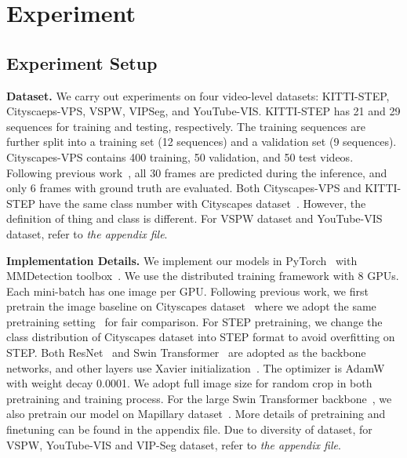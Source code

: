 \section{Experiment}
\label{sec:experiment}



\subsection{Experiment Setup}

\noindent
\textbf{Dataset.} We carry out experiments on four video-level datasets: KITTI-STEP, Cityscaeps-VPS, VSPW, VIPSeg, and YouTube-VIS. KITTI-STEP has 21 and 29 sequences for training and testing, respectively. The training sequences are further split into a training set (12 sequences) and a validation set (9 sequences). Cityscapes-VPS contains 400 training, 50 validation, and 50 test videos. Following previous work~\cite{kim2020vps}, all 30 frames are predicted during the inference, and only 6 frames with ground truth are evaluated. Both Cityscapes-VPS and KITTI-STEP have the same class number with Cityscapes dataset~\cite{cordts2016cityscapes}. However, the definition of thing and class is different. For VSPW dataset and YouTube-VIS dataset, refer to \textit{the appendix file}.



\noindent
\textbf{Implementation Details.} We implement our models in PyTorch~\cite{pytorch_paper} with MMDetection toolbox~\cite{chen2019mmdetection}. We use the distributed training framework with 8 GPUs. Each mini-batch has one image per GPU. Following previous work, we first pretrain the image baseline on Cityscapes dataset~\cite{cordts2016cityscapes} where we adopt the same pretraining setting~\cite{cheng2020panoptic,STEP} for fair comparison. For STEP pretraining, we change the class distribution of Cityscapes dataset into STEP format to avoid overfitting on STEP. Both ResNet~\cite{resnet} and Swin Transformer~\cite{liu2021swin} are adopted as the backbone networks, and other layers use Xavier initialization~\cite{xavier_init}. The optimizer is AdamW~\cite{ADAMW} with weight decay 0.0001. We adopt full image size for random crop in both pretraining and training process. For the large Swin Transformer backbone~\cite{liu2021swin}, we also pretrain our model on Mapillary dataset~\cite{neuhold2017mapillary}. More details of pretraining and finetuning can be found in the appendix file. Due to diversity of dataset, for VSPW, YouTube-VIS and VIP-Seg dataset, refer to \textit{the appendix file}.



